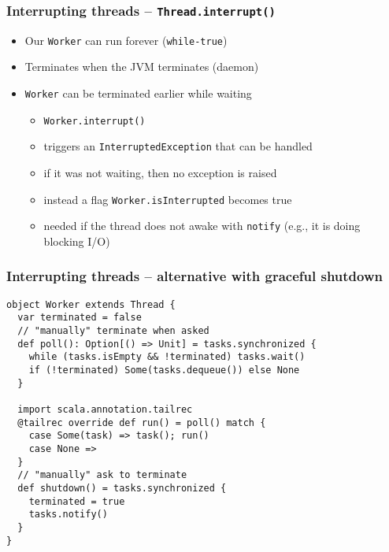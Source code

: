 \documentclass[aspectratio=169]{beamer}
\begin{document}
\begin{frame}\frametitle{Interrupting threads -- \texttt{Thread.interrupt()}}
\begin{itemize}
  \item Our \texttt{Worker} can run forever (\texttt{while-true})
  \item Terminates when the JVM terminates (daemon)
  \item \texttt{Worker} can be terminated earlier while waiting
    \begin{itemize}
      \item \alert{\texttt{Worker.interrupt()}}
      \item triggers an \alert{\texttt{InterruptedException}} that can be handled
      \item if it was not waiting, then no exception is raised
      \item instead a flag \alert{\texttt{Worker.isInterrupted}} becomes true
      \item needed if the thread does not awake with \texttt{notify} (e.g., it is doing blocking I/O)
    \end{itemize}
\end{itemize}
\end{frame}

\begin{frame}[fragile]\frametitle{Interrupting threads -- alternative with \alert{graceful shutdown}}
    
\begin{lstlisting}[emph={sleep,log,thread,join,synchronized,wait,notify,shutdown,terminated}]
object Worker extends Thread {
  var terminated = false
  // "manually" terminate when asked
  def poll(): Option[() => Unit] = tasks.synchronized {
    while (tasks.isEmpty && !terminated) tasks.wait()
    if (!terminated) Some(tasks.dequeue()) else None
  }

  import scala.annotation.tailrec
  @tailrec override def run() = poll() match {
    case Some(task) => task(); run()
    case None =>
  }
  // "manually" ask to terminate
  def shutdown() = tasks.synchronized {
    terminated = true
    tasks.notify()
  }
}
\end{lstlisting}

\end{frame}
\end{document}
